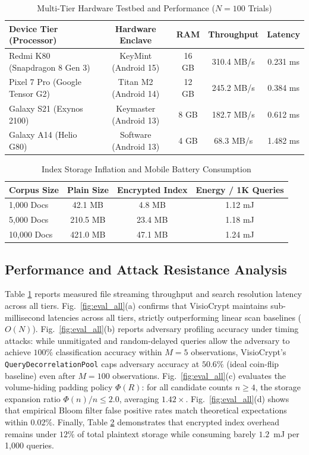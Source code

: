 \documentclass[10pt,conference]{IEEEtran}
\begin{document}
\begin{table}[t]
\centering
\caption{Multi-Tier Hardware Testbed and Performance ($N=100$ Trials)}
\label{tab:testbed_perf}
\scriptsize
\setlength{\tabcolsep}{2.5pt}
\renewcommand{\arraystretch}{1.05}
\begin{tabular}{lcccc}
\toprule
\textbf{Device Tier (Processor)} & \textbf{Hardware Enclave} & \textbf{RAM} & \textbf{Throughput} & \textbf{Latency} \\
\midrule
Redmi K80 (Snapdragon 8 Gen 3) & KeyMint (Android 15) & 16 GB & 310.4 MB/s & 0.231 ms \\
Pixel 7 Pro (Google Tensor G2) & Titan M2 (Android 14) & 12 GB & 245.2 MB/s & 0.384 ms \\
Galaxy S21 (Exynos 2100) & Keymaster (Android 13) & 8 GB & 182.7 MB/s & 0.612 ms \\
Galaxy A14 (Helio G80) & Software (Android 13) & 4 GB & 68.3 MB/s & 1.482 ms \\
\bottomrule
\end{tabular}
\end{table}

\begin{table}[t]
\centering
\caption{Index Storage Inflation and Mobile Battery Consumption}
\label{tab:storage_energy}
\scriptsize
\setlength{\tabcolsep}{4pt}
\begin{tabular}{lccc}
\toprule
\textbf{Corpus Size} & \textbf{Plain Size} & \textbf{Encrypted Index} & \textbf{Energy / 1K Queries} \\
\midrule
1,000 Docs & 42.1 MB & 4.8 MB & 1.12 mJ \\
5,000 Docs & 210.5 MB & 23.4 MB & 1.18 mJ \\
10,000 Docs & 421.0 MB & 47.1 MB & 1.24 mJ \\
\bottomrule
\end{tabular}
\end{table}

\subsection{Performance and Attack Resistance Analysis}
Table \ref{tab:testbed_perf} reports measured file streaming throughput and search resolution latency across all tiers. Fig.~\ref{fig:eval_all}(a) confirms that VisioCrypt maintains sub-millisecond latencies across all tiers, strictly outperforming linear scan baselines ($O(N)$). Fig.~\ref{fig:eval_all}(b) reports adversary profiling accuracy under timing attacks: while unmitigated and random-delayed queries allow the adversary to achieve $100\%$ classification accuracy within $M=5$ observations, VisioCrypt's \texttt{QueryDecorrelationPool} caps adversary accuracy at $50.6\%$ (ideal coin-flip baseline) even after $M=100$ observations. Fig.~\ref{fig:eval_all}(c) evaluates the volume-hiding padding policy $\Phi(R)$: for all candidate counts $n \ge 4$, the storage expansion ratio $\Phi(n)/n \le 2.0$, averaging $1.42\times$. Fig.~\ref{fig:eval_all}(d) shows that empirical Bloom filter false positive rates match theoretical expectations within $0.02\%$. Finally, Table \ref{tab:storage_energy} demonstrates that encrypted index overhead remains under $12\%$ of total plaintext storage while consuming barely $1.2$~mJ per 1,000 queries.
\end{document}
